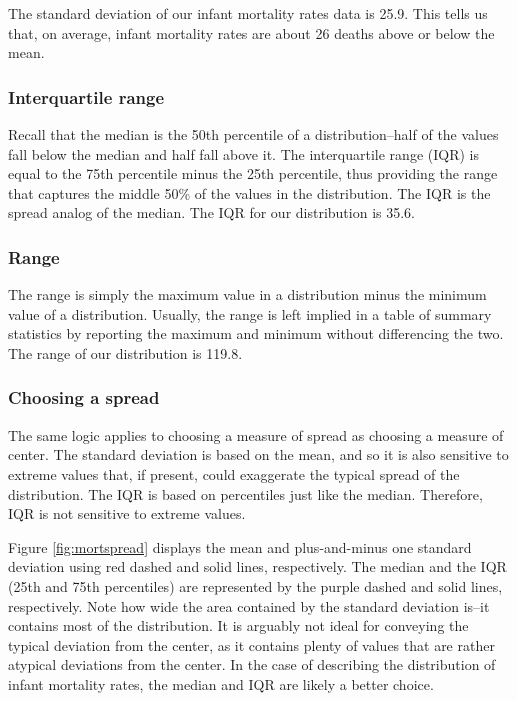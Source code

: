 \documentclass[
]{book}
\begin{document}
The standard deviation of our infant mortality rates data is 25.9. This tells us that, on average, infant mortality rates are about 26 deaths above or below the mean.

\hypertarget{interquartile-range}{%
\subsubsection*{Interquartile range}\label{interquartile-range}}

Recall that the median is the 50th percentile of a distribution--half of the values fall below the median and half fall above it. The interquartile range (IQR) is equal to the 75th percentile minus the 25th percentile, thus providing the range that captures the middle 50\% of the values in the distribution. The IQR is the spread analog of the median. The IQR for our distribution is 35.6.

\hypertarget{range}{%
\subsubsection*{Range}\label{range}}

The range is simply the maximum value in a distribution minus the minimum value of a distribution. Usually, the range is left implied in a table of summary statistics by reporting the maximum and minimum without differencing the two. The range of our distribution is 119.8.

\hypertarget{choosing-a-spread}{%
\subsubsection*{Choosing a spread}\label{choosing-a-spread}}

The same logic applies to choosing a measure of spread as choosing a measure of center. The standard deviation is based on the mean, and so it is also sensitive to extreme values that, if present, could exaggerate the typical spread of the distribution. The IQR is based on percentiles just like the median. Therefore, IQR is not sensitive to extreme values.

Figure \ref{fig:mortspread} displays the mean and plus-and-minus one standard deviation using red dashed and solid lines, respectively. The median and the IQR (25th and 75th percentiles) are represented by the purple dashed and solid lines, respectively. Note how wide the area contained by the standard deviation is--it contains most of the distribution. It is arguably not ideal for conveying the typical deviation from the center, as it contains plenty of values that are rather atypical deviations from the center. In the case of describing the distribution of infant mortality rates, the median and IQR are likely a better choice.
\end{document}
